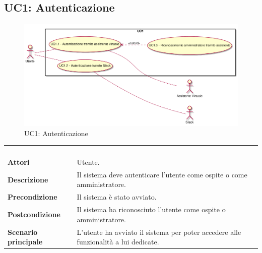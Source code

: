 \newpage\subsection{UC1: Autenticazione}
\label{UC1}
\begin{figure}[h]
\centering
\includegraphics[width=\textwidth,height=\textheight,keepaspectratio]{images/UseCaseUC1.png}
\caption{UC1: Autenticazione}
\end{figure}
\begin{longtable}{l|p{10cm}}
\rowcolor[gray]{0.8} \multicolumn{2}{c}{} \\
\rowcolor[gray]{0.8} \multicolumn{2}{c}{\textbf{UC1 - Autenticazione}} \\
\rowcolor[gray]{0.8} \multicolumn{2}{c}{} \\
\hline
&\\
\textbf{Attori} & Utente.\\[7pt]
\textbf{Descrizione} & Il sistema deve autenticare l'utente come ospite o come amministratore.\\[7pt]
\textbf{Precondizione} & Il sistema è stato avviato.\\[7pt]
\textbf{Postcondizione} & Il sistema ha riconosciuto l'utente come ospite o amministratore.\\[7pt]
\textbf{Scenario principale} &L'utente ha avviato il sistema per poter accedere alle funzionalità a lui dedicate.\\[7pt]\hline
\end{longtable}

